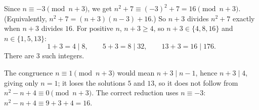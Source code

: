 Since $n\equiv-3\pmod{n+3}$, we get $n^2+7\equiv(-3)^2+7=16\pmod{n+3}$. (Equivalently, $n^2+7=(n+3)(n-3)+16$.) So $n+3$ divides $n^2+7$ exactly when $n+3$ divides $16$. For positive $n$, $n+3\ge4$, so $n+3\in\{4,8,16\}$ and $n\in\{1,5,13\}$:
\[1+3=4\mid8,\qquad 5+3=8\mid32,\qquad 13+3=16\mid176.\]
There are $\boxed{3}$ such integers.

The congruence $n\equiv1\pmod{n+3}$ would mean $n+3\mid n-1$, hence $n+3\mid4$, giving only $n=1$; it loses the solutions $5$ and $13$, so it does not follow from $n^2-n+4\equiv0\pmod{n+3}$. The correct reduction uses $n\equiv-3$: $n^2-n+4\equiv9+3+4=16$.
